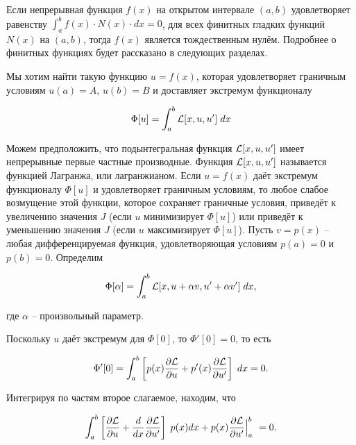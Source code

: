 \documentclass{article}
\begin{document}
\begin{warn}
	Если непрерывная функция $f(x)$ на открытом интервале $(a, b)$ удовлетворяет равенству $\int_{a}^{b} f(x) \cdot N(x) \cdot dx = 0$, 
	\noindent для всех финитных гладких функций $N(x)$ на $(a, b)$, тогда $f(x)$ является тождественным нулём. Подробнее о финитных функциях будет рассказано в следующих разделах.
\end{warn}

Мы хотим найти такую функцию $u = f(x)$, которая удовлетворяет граничным условиям $u(a) = A$, $u(b) = B$ и доставляет экстремум функционалу

\begin{displaymath}
	\Phi[u] = \int_{a}^{b} \mathcal{L}[x, u, u'] \; dx
\end{displaymath}

Можем предположить, что подынтегральная функция $\mathcal{L}[x, u, u']$ имеет непрерывные первые частные производные. Функция $\mathcal{L}[x, u, u']$ называется функцией Лагранжа, или лагранжианом. 
Если $u = f(x)$ даёт экстремум функционалу $\Phi[u]$ и удовлетворяет граничным условиям, то любое слабое возмущение этой функции, 
которое сохраняет граничные условия, приведёт к увеличению значения $J$ (если $u$ минимизирует $\Phi[u]$) или приведёт к уменьшению значения $J$ (если $u$ максимизирует $\Phi[u]$).
Пусть $v = p(x)$ -- любая дифференцируемая функция, удовлетворяющая условиям $p(a) = 0$ и $p(b) = 0$.
Определим

\begin{displaymath}
	\Phi[\alpha] = \int_{a}^{b} \mathcal{L}[x, u + \alpha v, u' +  \alpha v'] \; dx,
\end{displaymath}

\noindent где $\alpha$ -- произвольный параметр.

Поскольку $u$ даёт экстремум для $\Phi[0]$, то $\Phi'[0] = 0$, то есть

\begin{displaymath}
	\Phi'[0] = \int_{a}^{b} \left[ p(x) \frac{\partial \mathcal{L}}{\partial u} + p ' (x) \frac{\partial \mathcal{L}}{\partial u'} \right]  \; dx = 0.
\end{displaymath}

\noindent Интегрируя по частям второе слагаемое, находим, что 

\begin{displaymath}
	\int_{a}^{b} \left[\frac{\partial \mathcal{L}}{\partial u} + \frac{d}{dx} \frac{\partial \mathcal{L}}{\partial u'} \right]  \; p(x) dx + p(x) \frac{\partial \mathcal{L}}{\partial u'} \Big|_a^b \ = 0.
\end{displaymath}
\end{document}
